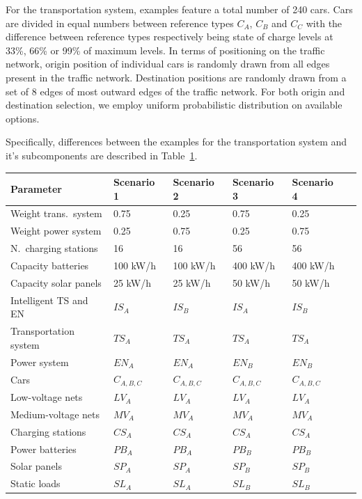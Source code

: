 For the transportation system, examples feature a total number of 240 cars. Cars are divided in equal numbers between reference types $C_{A}$, $C_{B}$ and $C_{C}$ with the difference between reference types respectively being state of charge levels at 33\%, 66\% or 99\% of maximum levels. In terms of positioning on the traffic network, origin position of individual cars is randomly drawn from all edges present in the traffic network. Destination positions are randomly drawn from a set of 8 edges of most outward edges of the traffic network. For both origin and destination selection, we employ uniform probabilistic distribution on available options. 

Specifically, differences between the examples for the transportation system and it's subcomponents are described in Table~\ref{tab:example1}. 

\begin{table}[h]
	\renewcommand{\arraystretch}{1.3}
	\label{tab:example1}
	\centering
	\begin{tabularx}{\columnwidth}{Xlllll}
		\hline
		\textbf{Parameter}                    & \textbf{Scenario 1}    & \textbf{Scenario 2} & \textbf{Scenario 3} & \textbf{Scenario 4}\\ \hline
		Weight trans.\ system 			& 0.75	      & 0.25  	& 0.75	& 0.25\\
		Weight power system 			& 0.25	      & 0.75  	& 0.25	& 0.75\\
		N.\ charging stations              & 16         & 16 		& 56	& 56\\
		Capacity batteries          & 100 kW/h         & 100 kW/h 		& 400 kW/h		& 400 kW/h\\
		Capacity solar panels               & 25 kW/h         & 25 kW/h 		& 50 kW/h		& 50 kW/h	\\ \hline
		Intelligent TS and EN                 & $IS_{A}$         & $IS_{B}$ 		& $IS_{A}$		& $IS_{B}$	\\ 
		Transportation system                 & $TS_{A}$         & $TS_{A}$ 		& $TS_{A}$		& $TS_{A}$	\\ 
		Power system                & $EN_{A}$         & $EN_{A}$ 		& $EN_{B}$		& $EN_{B}$	\\ 
		Cars                  & $C_{A,B,C}$          & $C_{A,B,C}$		& $C_{A,B,C}$		& $C_{A,B,C}$	\\ 
		Low-voltage nets                 & $LV_{A}$         & $LV_{A}$ 		& $LV_{A}$		& $LV_{A}$	\\ 
		Medium-voltage nets                 & $MV_{A}$         & $MV_{A}$ 		& $MV_{A}$		& $MV_{A}$	\\ 
		Charging stations                 & $CS_{A}$         & $CS_{A}$ 		& $CS_{A}$		& $CS_{A}$	\\ 
		Power batteries                & $PB_{A}$         & $PB_{A}$ 		& $PB_{B}$		& $PB_{B}$	\\ 
		Solar panels                 & $SP_{A}$         & $SP_{A}$ 		& $SP_{B}$		& $SP_{B}$	\\ 
		Static loads                 & $SL_{A}$         & $SL_{A}$ 		& $SL_{B}$		& $SL_{B}$	\\ \hline
	\end{tabularx}
\end{table}

